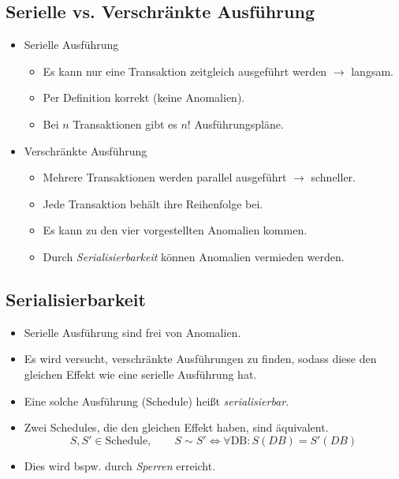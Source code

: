 \documentclass[a4paper, 11pt, accentcolor = tud3b]{tudreport}
\newcommand{\DB}{\text{DB}}
\begin{document}
            \subsection{Serielle vs. Verschränkte Ausführung} %
                \begin{itemize}
                	\item Serielle Ausführung
                		\begin{itemize}
                			\item Es kann nur eine Transaktion zeitgleich ausgeführt werden \( \rightarrow \) langsam.
                			\item Per Definition korrekt (keine Anomalien).
                			\item Bei \(n\) Transaktionen gibt es \(n!\) Ausführungspläne.
                		\end{itemize}
                	\item Verschränkte Ausführung
                		\begin{itemize}
                			\item Mehrere Transaktionen werden parallel ausgeführt \( \rightarrow \) schneller.
                			\item Jede Transaktion behält ihre Reihenfolge bei.
                			\item Es kann zu den vier vorgestellten Anomalien kommen.
                			\item Durch \textit{Serialisierbarkeit} können Anomalien vermieden werden.
                		\end{itemize}
                \end{itemize}

            \subsection{Serialisierbarkeit} %
                \begin{itemize}
                	\item Serielle Ausführung sind frei von Anomalien.
                	\item Es wird versucht, verschränkte Ausführungen zu finden, sodass diese den gleichen Effekt wie eine serielle Ausführung hat.
                	\item Eine solche Ausführung (Schedule) heißt \textit{serialisierbar}.
                	\item Zwei Schedules, die den gleichen Effekt haben, sind äquivalent.
                		\begin{equation*}
	                		S, S' \in \text{Schedule}, \quad\quad S \sim S' \iff \forall \DB : S(DB) = S'(DB)
                		\end{equation*}
                	\item Dies wird bspw. durch \textit{Sperren} erreicht.
                \end{itemize}
\end{document}
